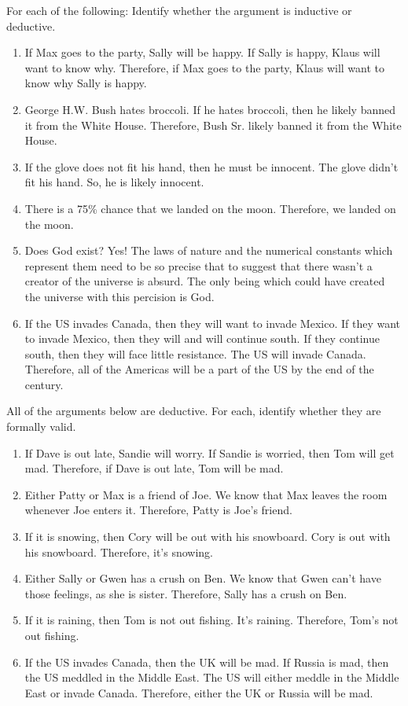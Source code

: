 \practiceproblems
\problempart
\label{pr.typesofargs}
For each of the following: Identify whether the argument is inductive or deductive.
\begin{enumerate}
\item If Max goes to the party, Sally will be happy. If Sally is happy, Klaus will want to know why. Therefore, if Max goes to the party, Klaus will want to know why Sally is happy.
\item George H.W. Bush hates broccoli. If he hates broccoli, then he likely banned it from the White House. Therefore, Bush Sr. likely banned it from the White House.
\item If the glove does not fit his hand, then he must be innocent. The glove didn't fit his hand. So, he is likely innocent. 
\item There is a 75\% chance that we landed on the moon. Therefore, we landed on the moon.
\item Does God exist? Yes! The laws of nature and the numerical constants which represent them need to be so precise that to suggest that there wasn't a creator of the universe is absurd. The only being which could have created the universe with this percision is God. 
\item If the US invades Canada, then they will want to invade Mexico. If they want to invade Mexico, then they will and will continue south. If they continue south, then they will face little resistance. The US will invade Canada. Therefore, all of the Americas will be a part of the US by the end of the century. 
\end{enumerate}

\problempart
\label{pr.validity}
All of the arguments below are deductive. For each, identify whether they are formally valid.
\begin{enumerate}
\item If Dave is out late, Sandie will worry. If Sandie is worried, then Tom will get mad. Therefore, if Dave is out late, Tom will be mad.
\item Either Patty or Max is a friend of Joe. We know that Max leaves the room whenever Joe enters it. Therefore, Patty is Joe's friend.
\item If it is snowing, then Cory will be out with his snowboard. Cory is out with his snowboard. Therefore, it's snowing. 
\item Either Sally or Gwen has a crush on Ben. We know that Gwen can't have those feelings, as she is sister. Therefore, Sally has a crush on Ben.
\item If it is raining, then Tom is not out fishing. It's raining. Therefore, Tom's not out fishing. 
\item If the US invades Canada, then the UK will be mad. If Russia is mad, then the US meddled in the Middle East. The US will either meddle in the Middle East or invade Canada. Therefore, either the UK or Russia will be mad.  
\end{enumerate}

